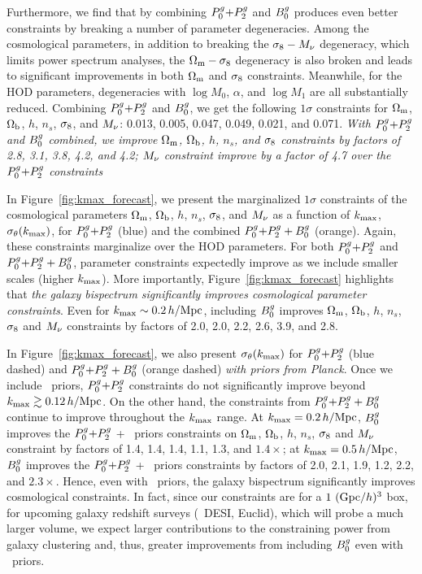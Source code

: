 Furthermore, we find that by combining $P^g_0{+}P^g_2$ and $B^g_0$ produces even better
constraints by breaking a number of parameter degeneracies. Among the cosmological 
parameters, in addition to breaking the $\sigma_8 - M_\nu$ degeneracy, which limits
power spectrum analyses, the $\Omega_{\rm m}-\sigma_8$ degeneracy is also broken and leads to
significant improvements in both $\Omega_{\rm m}$ and 
$\sigma_8$ constraints. Meanwhile, for the HOD parameters, degeneracies with 
$\log M_0$, $\alpha$, and $\log M_1$ are all substantially reduced. 
Combining $P^g_0{+}P^g_2$ and $B^g_0$, we get the following $1\sigma$ constraints for 
 $\Omega_{\rm m}$, $\Omega_{\rm b}$, $h$, $n_s$, $\sigma_8$, and $M_\nu$: 
0.013, 0.005, 0.047, 0.049, 0.021, and 0.071.
{\em With $P^g_0{+}P^g_2$ and $B^g_0$ combined, we improve $\Omega_{\rm m}$, $\Omega_{\rm b}$, $h$,
$n_s$, and $\sigma_8$ constraints by factors of 2.8, 3.1, 3.8, 4.2, and 4.2;
$M_\nu$ constraint improve by a factor of 4.7 over the $P^g_0{+}P^g_2$ constraints}

In Figure~\ref{fig:kmax_forecast}, we present the marginalized $1\sigma$
constraints of the cosmological parameters $\Omega_{\rm m}$, $\Omega_{\rm b}$, $h$, $n_s$, $\sigma_8$, 
and $M_\nu$ as a function of $k_{\rm max}$, $\sigma_\theta(k_{\rm max})$, for $P^g_0{+}P^g_2$
(blue) and the combined $P^g_0{+}P^g_2 + B^g_0$ (orange). Again, these constraints
marginalize over the \cite{zheng2007} HOD parameters. For both $P^g_0{+}P^g_2$ and
$P^g_0{+}P^g_2 + B^g_0$, parameter constraints expectedly improve as
we include smaller scales (higher $k_{\rm max}$). More importantly,
Figure~\ref{fig:kmax_forecast} highlights that {\em the galaxy bispectrum
significantly improves cosmological parameter constraints}. Even for 
$k_{\rm max}\sim 0.2\,h/\mathrm{Mpc}$, including 
$B^g_0$ improves $\Omega_{\rm m}$, $\Omega_{\rm b}$, $h$, $n_s$, $\sigma_8$ and $M_\nu$ constraints by 
factors of 2.0, 2.0, 2.2, 2.6, 3.9, and 2.8.

In Figure~\ref{fig:kmax_forecast}, we also present $\sigma_\theta(k_{\rm max})$ for
$P^g_0{+}P^g_2$ (blue dashed) and $P^g_0{+}P^g_2 + B^g_0$ 
(orange dashed) {\em with priors from Planck}. Once we include \planck~priors,
$P^g_0{+}P^g_2$ constraints do not significantly improve beyond $k_{\rm max} \gtrsim 0.12\,h/\mathrm{Mpc}$.
On the other hand, the constraints from $P^g_0{+}P^g_2 + B^g_0$ continue to improve 
throughout the $k_{\rm max}$ range. 
At $k_{\rm max}=0.2\,h/\mathrm{Mpc}$, $B^g_0$ improves the $P^g_0{+}P^g_2$ + \planck~priors constraints on  
$\Omega_{\rm m}$, $\Omega_{\rm b}$, $h$, $n_s$, $\sigma_8$ and $M_\nu$ constraint by factors of
1.4, 1.4, 1.4, 1.1, 1.3, and $1.4\times$;
at $k_{\rm max} = 0.5\,h/\mathrm{Mpc}$, $B^g_0$ improves the $P^g_0{+}P^g_2$ + \planck~priors constraints 
by factors of 2.0, 2.1, 1.9, 1.2, 2.2, and $2.3\times$. Hence, even with 
\planck~priors, the galaxy bispectrum significantly improves cosmological 
constraints. In fact, since our constraints are for a  $1~({\rm Gpc}/h)^3$ 
box, for upcoming
galaxy redshift surveys (\eg~DESI, Euclid), which will probe a much larger
volume, we expect larger contributions to the constraining power from galaxy 
clustering and, thus, greater improvements from including $B^g_0$ even
with \planck~priors. 

